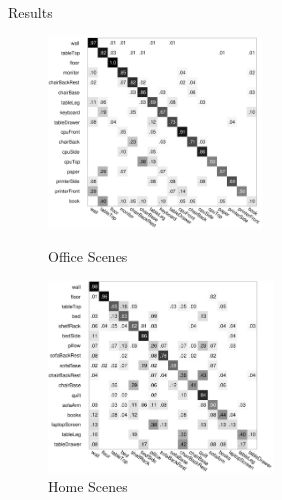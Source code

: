 \documentclass{beamer}
\begin{document}
\begin{frame}{Results}

  \begin{figure}
  \begin{minipage}[b]{0.45\linewidth}
\centering
\includegraphics[width=\linewidth,height=2in]{objassoc_office_radius0_6.pdf} 
\caption{Office Scenes}

\end{minipage}
\hspace{0.5cm}
  \begin{minipage}[b]{0.45\linewidth}
\centering		             
		\includegraphics[width=\linewidth,height=2in]{objassoc_home_radius0_6.pdf} 
\caption{Home Scenes}

\end{minipage}		
		
	\end{figure}

\end{frame}
\end{document}
